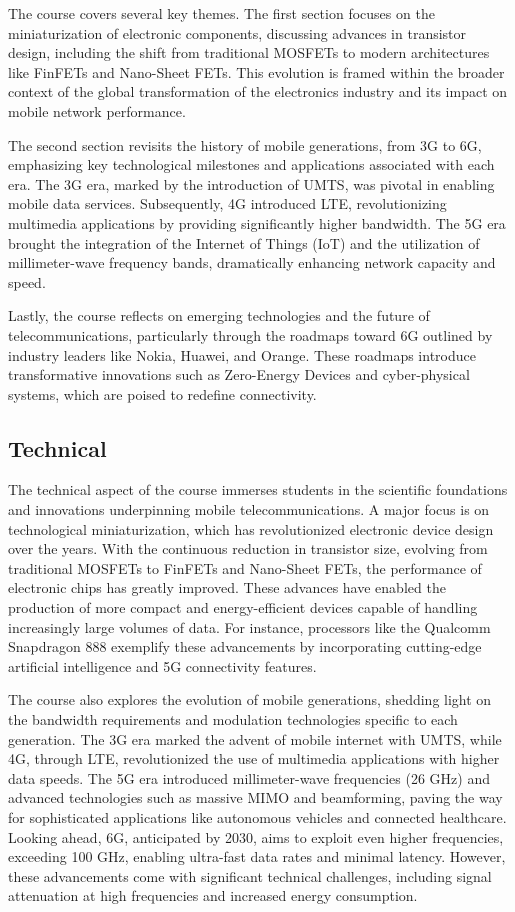 The course covers several key themes. The first section focuses on the miniaturization of electronic components, discussing advances in transistor design, including the shift from traditional MOSFETs to modern architectures like FinFETs and Nano-Sheet FETs. This evolution is framed within the broader context of the global transformation of the electronics industry and its impact on mobile network performance.

The second section revisits the history of mobile generations, from 3G to 6G, emphasizing key technological milestones and applications associated with each era. The 3G era, marked by the introduction of UMTS, was pivotal in enabling mobile data services. Subsequently, 4G introduced LTE, revolutionizing multimedia applications by providing significantly higher bandwidth. The 5G era brought the integration of the Internet of Things (IoT) and the utilization of millimeter-wave frequency bands, dramatically enhancing network capacity and speed.

Lastly, the course reflects on emerging technologies and the future of telecommunications, particularly through the roadmaps toward 6G outlined by industry leaders like Nokia, Huawei, and Orange. These roadmaps introduce transformative innovations such as Zero-Energy Devices and cyber-physical systems, which are poised to redefine connectivity.
\subsection{Technical}

The technical aspect of the course immerses students in the scientific foundations and innovations underpinning mobile telecommunications. A major focus is on technological miniaturization, which has revolutionized electronic device design over the years. With the continuous reduction in transistor size, evolving from traditional MOSFETs to FinFETs and Nano-Sheet FETs, the performance of electronic chips has greatly improved. These advances have enabled the production of more compact and energy-efficient devices capable of handling increasingly large volumes of data. For instance, processors like the Qualcomm Snapdragon 888 exemplify these advancements by incorporating cutting-edge artificial intelligence and 5G connectivity features.

The course also explores the evolution of mobile generations, shedding light on the bandwidth requirements and modulation technologies specific to each generation. The 3G era marked the advent of mobile internet with UMTS, while 4G, through LTE, revolutionized the use of multimedia applications with higher data speeds. The 5G era introduced millimeter-wave frequencies (26 GHz) and advanced technologies such as massive MIMO and beamforming, paving the way for sophisticated applications like autonomous vehicles and connected healthcare. Looking ahead, 6G, anticipated by 2030, aims to exploit even higher frequencies, exceeding 100 GHz, enabling ultra-fast data rates and minimal latency. However, these advancements come with significant technical challenges, including signal attenuation at high frequencies and increased energy consumption.

